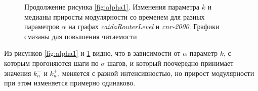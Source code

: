 \begin{figure}[H]
\begin{tikzpicture}
	\end{tikzpicture}
	\hskip -1.7cm
	\caption{Продолжение рисунка \ref{fig:alpha1}. Изменения параметра $k$ и медианы приросты модулярности со временем для разных параметров $\alpha$ на графах \emph{caidaRouterLevel} и \emph{cnr-2000}. Графики смазаны для повышения читаемости}
	\label{fig:alpha2}
\end{figure}

Из рисунков \ref{fig:alpha1} и \ref{fig:alpha2} видно, что в зависимости от $\alpha$ параметр $k$, с которым прогоняются шаги по $\sigma$ шагов, и который поочередно принимает значения $k_n^{-}$ и $k_n^{+}$, меняется с разной интенсивностью, но прирост модулярности при этом изменяется примерно одинаково.
